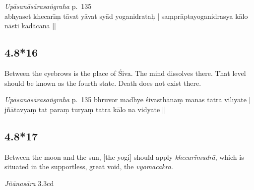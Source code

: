 \begin{ekdosis}

\begin{testimonia}[hp04_008_15]
\emph{Upāsanāsārasaṅgraha} p.~135\\
abhyaset khecarīṃ tāvat yāvat syād yoganidrataḥ |
saṃprāptayoganidrasya kālo nāsti kadācana ||
\end{testimonia}

\begin{philcomm}[hp04_008_15]
\end{philcomm}



\subsection*{4.8*16}
\begin{translation}[hp04_008_16]
Between the eyebrows is the place of Śiva. The mind dissolves there. That level should be known as the fourth state. Death does not exist there.
\end{translation}
%


\begin{testimonia}[hp04_008_16]
\emph{Upāsanāsārasaṅgraha} p.~135
bhruvor madhye śivasthānaṃ manas tatra vilīyate |
jñātavyaṃ tat paraṃ turyaṃ tatra kālo na vidyate ||
\end{testimonia}


\subsection*{4.8*17}
\begin{translation}[hp04_008_17]
Between the moon and the sun, [the yogi] should apply \emph{khecarīmudrā}, which is situated in the supportless, great void, the \emph{vyomacakra}.
\end{translation}

\begin{sources}[hp04_008_17]
\emph{Jñānasāra} 3.3cd
\begin{versinnote}
\end{versinnote}


\end{sources}
\end{ekdosis}
